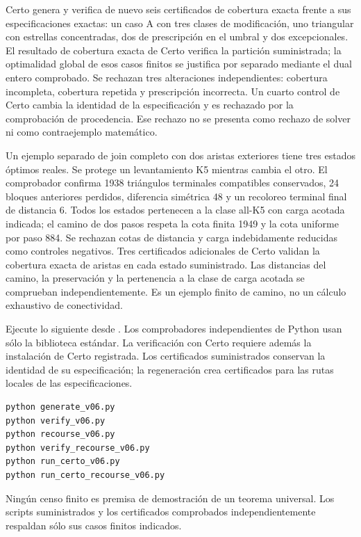 \documentclass[spanish,11pt,a4paper]{article}
\begin{document}
Certo genera y verifica de nuevo seis certificados de cobertura exacta
frente a sus especificaciones exactas: un caso A con tres clases de
modificación, uno triangular con estrellas concentradas, dos de
prescripción en el umbral y dos excepcionales. El resultado de cobertura
exacta de Certo verifica la partición suministrada; la optimalidad
global de esos casos finitos se justifica por separado mediante el dual
entero comprobado. Se rechazan tres alteraciones independientes:
cobertura incompleta, cobertura repetida y prescripción incorrecta. Un
cuarto control de Certo cambia la identidad de la especificación y es
rechazado por la comprobación de procedencia. Ese rechazo no se presenta
como rechazo de solver ni como contraejemplo matemático.

Un ejemplo separado de join completo con dos aristas exteriores tiene
tres estados óptimos reales. Se protege un levantamiento K5 mientras
cambia el otro. El comprobador confirma 1938 triángulos terminales
compatibles conservados, 24 bloques anteriores perdidos, diferencia
simétrica 48 y un recoloreo terminal final de distancia 6. Todos los
estados pertenecen a la clase all-K5 con carga acotada indicada; el
camino de dos pasos respeta la cota finita 1949 y la cota uniforme por
paso 884. Se rechazan cotas de distancia y carga indebidamente reducidas
como controles negativos. Tres certificados adicionales de Certo validan
la cobertura exacta de aristas en cada estado suministrado. Las
distancias del camino, la preservación y la pertenencia a la clase de
carga acotada se comprueban independientemente. Es un ejemplo finito de
camino, no un cálculo exhaustivo de conectividad.

Ejecute lo siguiente desde . Los
comprobadores independientes de Python usan sólo la biblioteca estándar.
La verificación con Certo requiere además la instalación de Certo
registrada. Los certificados suministrados conservan la identidad de su
especificación; la regeneración crea certificados para las rutas locales
de las especificaciones.

\begin{verbatim}
python generate_v06.py
python verify_v06.py
python recourse_v06.py
python verify_recourse_v06.py
python run_certo_v06.py
python run_certo_recourse_v06.py
\end{verbatim}

Ningún censo finito es premisa de demostración de un teorema universal.
Los scripts suministrados y los certificados comprobados
independientemente respaldan sólo sus casos finitos indicados.
\end{document}
